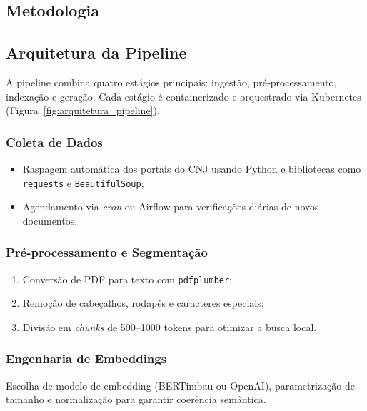 \begin{description}

\chapter{Metodologia}
\label{chap:metodologia}

\section{Arquitetura da Pipeline}
A pipeline combina quatro estágios principais: ingestão, pré‐processamento, indexação e geração. Cada estágio é containerizado e orquestrado via Kubernetes (Figura~\ref{fig:arquitetura_pipeline}).

\subsection{Coleta de Dados}
\begin{itemize}[label=\textbullet]
  \item Raspagem automática dos portais do CNJ usando Python e bibliotecas como \texttt{requests} e \texttt{BeautifulSoup};
  \item Agendamento via \emph{cron} ou Airflow para verificações diárias de novos documentos.
\end{itemize}

\subsection{Pré-processamento e Segmentação}
\begin{enumerate}[label=\arabic*.]
  \item Conversão de PDF para texto com \texttt{pdfplumber};
  \item Remoção de cabeçalhos, rodapés e caracteres especiais;
  \item Divisão em \emph{chunks} de 500--1000 tokens para otimizar a busca local.
\end{enumerate}

\subsection{Engenharia de Embeddings}
Escolha de modelo de embedding (BERTimbau ou OpenAI), parametrização de tamanho e normalização para garantir coerência semântica.


\end{description}
